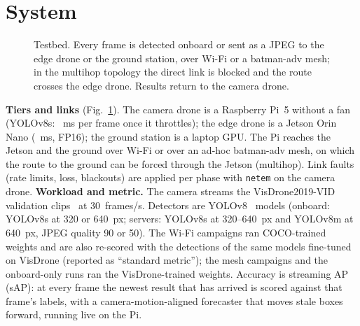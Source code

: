 \documentclass[conference]{IEEEtran}
\begin{document}
\section{System}\label{sec:system}
\begin{figure}[t]
\centering
{}
\caption{Testbed. Every frame is detected onboard or sent as a JPEG to the edge drone or the ground station, over Wi-Fi or
a batman-adv mesh; in the multihop topology the direct link is blocked and the route crosses the edge drone. Results
return to the camera drone.}
\label{fig:testbed}
\end{figure}
\textbf{Tiers and links} (Fig.~\ref{fig:testbed}). The camera drone is a Raspberry Pi~5 without a fan (YOLOv8s: \PiFullMs~ms per frame once it
throttles); the edge drone is a Jetson Orin Nano (\JetsonFullMs~ms, FP16); the ground station is a laptop GPU. The Pi
reaches the Jetson and the ground over Wi-Fi or over an ad-hoc batman-adv mesh, on which the route to the ground can be
forced through the Jetson (multihop). Link faults (rate limits, loss, blackouts) are applied per phase with
\texttt{netem} on the camera drone.
\textbf{Workload and metric.} The camera streams the VisDrone2019-VID validation clips~\cite{zhu2022visdrone} at
30~frames/s. Detectors are YOLOv8~\cite{jocher2023yolo} models (onboard: YOLOv8s at 320 or 640~px; servers: YOLOv8s at
320--640~px and YOLOv8m at 640~px, JPEG quality 90 or 50). The Wi-Fi campaigns ran COCO-trained weights and are also
re-scored with the detections of the same models fine-tuned on VisDrone (reported as ``standard metric''); the mesh
campaigns and the onboard-only runs ran the VisDrone-trained weights. Accuracy is streaming AP (sAP): at every frame
the newest result that has arrived is scored against that frame's labels, with a camera-motion-aligned forecaster that
moves stale boxes forward, running live on the Pi.
\end{document}
